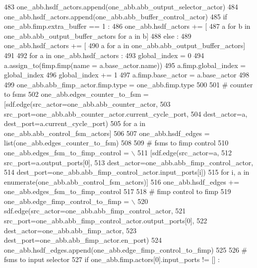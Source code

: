 \begin{DoxyCode}
483     one\_abb.hsdf\_actors.append(one\_abb.abb\_output\_selector\_actor)
484     one\_abb.hsdf\_actors.append(one\_abb.abb\_buffer\_control\_actor)
485     \textcolor{keywordflow}{if} one\_abb.fimp.extra\_buffer == 1 :
486       one\_abb.hsdf\_actors += [
487         a \textcolor{keywordflow}{for} b \textcolor{keywordflow}{in} one\_abb.abb\_output\_buffer\_actors \textcolor{keywordflow}{for} a \textcolor{keywordflow}{in} b]
488     \textcolor{keywordflow}{else} :
489       one\_abb.hsdf\_actors += [
490         a \textcolor{keywordflow}{for} a \textcolor{keywordflow}{in} one\_abb.abb\_output\_buffer\_actors]
491 
492   \textcolor{keywordflow}{for} a \textcolor{keywordflow}{in} one\_abb.hsdf\_actors :
493     global\_index = 0
494     a.assign\_to(fimp.fimp(name = a.base\_actor.name))
495     a.fimp.global\_index = global\_index
496     global\_index += 1
497     a.fimp.base\_actor = a.base\_actor
498 
499   one\_abb.abb\_fimp\_actor.fimp.type = one\_abb.fimp.type
500 
501   \textcolor{comment}{# counter to fsms}
502   one\_abb.edges\_counter\_to\_fsm = [sdf.edge(src\_actor=one\_abb.abb\_counter\_actor,
503                                            src\_port=one\_abb.abb\_counter\_actor.current\_cycle\_port,
504                                            dest\_actor=a, dest\_port=a.current\_cycle\_port)
505                                   \textcolor{keywordflow}{for} a \textcolor{keywordflow}{in} one\_abb.abb\_control\_fsm\_actors]
506 
507   one\_abb.hsdf\_edges = list(one\_abb.edges\_counter\_to\_fsm)
508 
509   \textcolor{comment}{# fsms to fimp control}
510   one\_abb.edges\_fsm\_to\_fimp\_control = \(\backslash\)
511       [sdf.edge(src\_actor=a,
512                 src\_port=a.output\_ports[0],
513                 dest\_actor=one\_abb.abb\_fimp\_control\_actor,
514                 dest\_port=one\_abb.abb\_fimp\_control\_actor.input\_ports[i])
515        \textcolor{keywordflow}{for} i, a \textcolor{keywordflow}{in} enumerate(one\_abb.abb\_control\_fsm\_actors)]
516   one\_abb.hsdf\_edges += one\_abb.edges\_fsm\_to\_fimp\_control
517 
518   \textcolor{comment}{# fimp control to fimp}
519   one\_abb.edge\_fimp\_control\_to\_fimp = \(\backslash\)
520       sdf.edge(src\_actor=one\_abb.abb\_fimp\_control\_actor,
521                src\_port=one\_abb.abb\_fimp\_control\_actor.output\_ports[0],
522                dest\_actor=one\_abb.abb\_fimp\_actor,
523                dest\_port=one\_abb.abb\_fimp\_actor.en\_port)
524   one\_abb.hsdf\_edges.append(one\_abb.edge\_fimp\_control\_to\_fimp)
525 
526   \textcolor{comment}{# fsms to input selector}
527   \textcolor{keywordflow}{if} one\_abb.fimp.actors[0].input\_ports != [] :

\end{DoxyCode}
